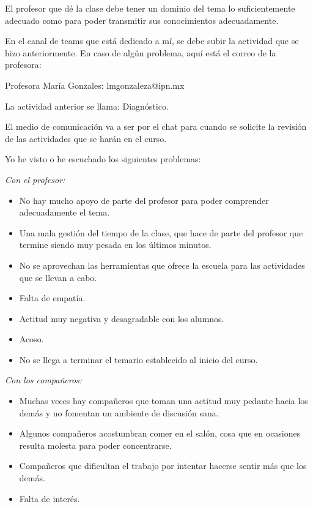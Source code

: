 \documentclass[12pt]{report}
\theoremstyle{largebreak}
\begin{document}
    El profesor que dé la clase debe tener un dominio del tema lo suficientemente adecuado como para poder transmitir sus conocimientos adecuadamente.


    En el canal de teams que está dedicado a mí, se debe subir la actividad que se hizo anteriormente. En caso de algún problema, aquí está el correo de la profesora:

    Profesora María Gonzales: lmgonzaleza@ipn.mx

    La actividad anterior se llama: Diagnóstico.

    El medio de comunicación va a ser por el chat para cuando se solicite la revisión de las actividades que se harán en el curso.


    Yo he visto o he escuchado los siguientes problemas:

    \textit{Con el profesor:}
    
    \begin{itemize}
        \item No hay mucho apoyo de parte del profesor para poder comprender adecuadamente el tema.
        \item Una mala gestión del tiempo de la clase, que hace de parte del profesor que termine siendo muy pesada en los últimos minutos.
        \item No se aprovechan las herramientas que ofrece la escuela para las actividades que se llevan a cabo.
        \item Falta de empatía.
        \item Actitud muy negativa y desagradable con los alumnos.
        \item Acoso.
        \item No se llega a terminar el temario establecido al inicio del curso.
    \end{itemize}

    \textit{Con los compañeros:}

    \begin{itemize}
        \item Muchas veces hay compañeros que toman una actitud muy pedante hacia los demás y no fomentan un ambiente de discusión sana.
        \item Algunos compañeros acostumbran comer en el salón, cosa que en ocasiones resulta molesta para poder concentrarse.
        \item Compañeros que dificultan el trabajo por intentar hacerse sentir más que los demás.
        \item Falta de interés.
    \end{itemize}
\end{document}
